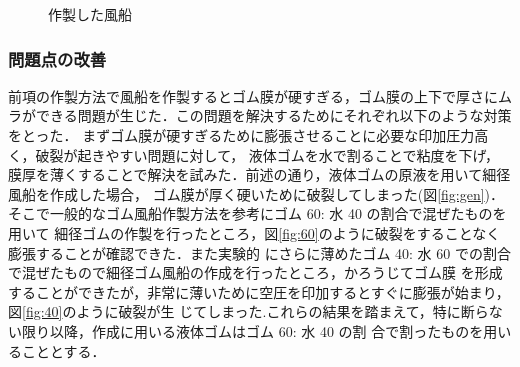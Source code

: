 \begin{figure}[!t]
  \caption{作製した風船}
  \label{fig:5}
\end{figure}

\newpage
\subsubsection{問題点の改善}
前項の作製方法で風船を作製するとゴム膜が硬すぎる，ゴム膜の上下で厚さにムラができる問題が生じた．この問題を解決するためにそれぞれ以下のような対策をとった．
まずゴム膜が硬すぎるために膨張させることに必要な印加圧力高く，破裂が起きやすい問題に対して，
液体ゴムを水で割ることで粘度を下げ，膜厚を薄くすることで解決を試みた．前述の通り，液体ゴムの原液を用いて細径風船を作成した場合，
ゴム膜が厚く硬いために破裂してしまった(図\ref{fig:gen})．そこで一般的なゴム風船作製方法を参考にゴム 60: 水 40 の割合で混ぜたものを用いて
細径ゴムの作製を行ったところ\cite{}，図\ref{fig:60}のように破裂をすることなく膨張することが確認できた．また実験的
にさらに薄めたゴム 40: 水 60 での割合で混ぜたもので細径ゴム風船の作成を行ったところ，かろうじてゴム膜
を形成することができたが，非常に薄いために空圧を印加するとすぐに膨張が始まり，図\ref{fig:40}のように破裂が生
じてしまった.これらの結果を踏まえて，特に断らない限り以降，作成に用いる液体ゴムはゴム 60: 水 40 の割
合で割ったものを用いることとする．

